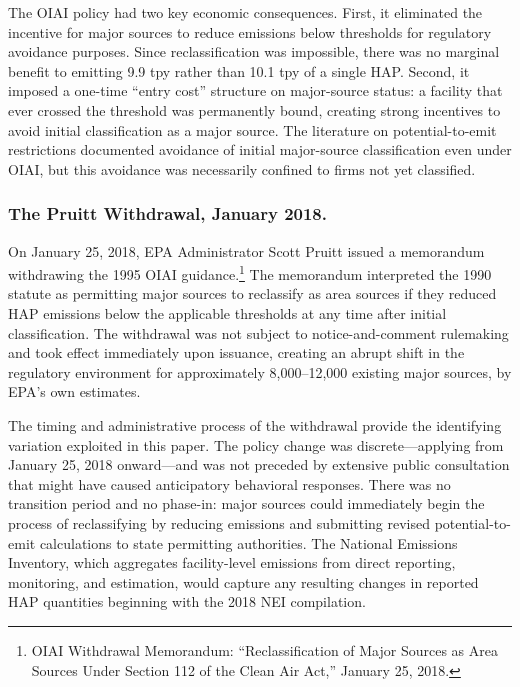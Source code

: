 \documentclass[12pt]{article}
\begin{document}
The OIAI policy had two key economic consequences. First, it eliminated the incentive for major sources to reduce emissions below thresholds for regulatory avoidance purposes. Since reclassification was impossible, there was no marginal benefit to emitting 9.9 tpy rather than 10.1 tpy of a single HAP. Second, it imposed a one-time ``entry cost'' structure on major-source status: a facility that ever crossed the threshold was permanently bound, creating strong incentives to avoid initial classification as a major source. The literature on potential-to-emit restrictions \citep{BurtrawCowanHiltonMargolis1998} documented avoidance of initial major-source classification even under OIAI, but this avoidance was necessarily confined to firms not yet classified.

\subsubsection*{The Pruitt Withdrawal, January 2018.}
On January 25, 2018, EPA Administrator Scott Pruitt issued a memorandum withdrawing the 1995 OIAI guidance.\footnote{OIAI Withdrawal Memorandum: ``Reclassification of Major Sources as Area Sources Under Section 112 of the Clean Air Act,'' January 25, 2018.} The memorandum interpreted the 1990 statute as permitting major sources to reclassify as area sources if they reduced HAP emissions below the applicable thresholds at any time after initial classification. The withdrawal was not subject to notice-and-comment rulemaking and took effect immediately upon issuance, creating an abrupt shift in the regulatory environment for approximately 8,000--12,000 existing major sources, by EPA's own estimates.

The timing and administrative process of the withdrawal provide the identifying variation exploited in this paper. The policy change was discrete---applying from January 25, 2018 onward---and was not preceded by extensive public consultation that might have caused anticipatory behavioral responses. There was no transition period and no phase-in: major sources could immediately begin the process of reclassifying by reducing emissions and submitting revised potential-to-emit calculations to state permitting authorities. The National Emissions Inventory, which aggregates facility-level emissions from direct reporting, monitoring, and estimation, would capture any resulting changes in reported HAP quantities beginning with the 2018 NEI compilation.
\end{document}
